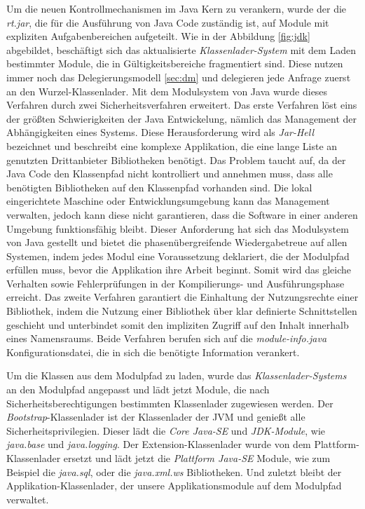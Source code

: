     Um die neuen Kontrollmechanismen im Java Kern zu verankern, wurde der die \textit{rt.jar}, die für die Ausführung von Java Code zuständig ist, auf Module mit expliziten Aufgabenbereichen aufgeteilt. Wie in der Abbildung \ref{fig:jdk} abgebildet, beschäftigt sich das aktualisierte \textit{Klassenlader-System} mit dem Laden bestimmter Module, die in Gültigkeitsbereiche fragmentiert sind. Diese nutzen immer noch das Delegierungsmodell \ref{sec:dm} und delegieren jede Anfrage zuerst an den Wurzel-Klassenlader. Mit dem Modulsystem von Java wurde dieses Verfahren durch zwei Sicherheitsverfahren erweitert. Das erste Verfahren löst eins der größten Schwierigkeiten der Java Entwickelung, nämlich das Management der Abhängigkeiten eines Systems. Diese Herausforderung wird als \textit{Jar-Hell} bezeichnet und beschreibt eine komplexe Applikation, die eine lange Liste an genutzten Drittanbieter Bibliotheken benötigt. Das Problem taucht auf, da der Java Code den Klassenpfad nicht kontrolliert und annehmen muss, dass alle benötigten Bibliotheken auf den Klassenpfad vorhanden sind. Die lokal eingerichtete Maschine oder Entwicklungsumgebung kann das Management verwalten, jedoch kann diese nicht garantieren, dass die Software in einer anderen Umgebung funktionsfähig bleibt.\newline
    Dieser Anforderung hat sich das Modulsystem von Java gestellt und bietet die phasenübergreifende Wiedergabetreue auf allen Systemen, indem jedes Modul eine Voraussetzung deklariert, die der Modulpfad erfüllen muss, bevor die Applikation ihre Arbeit beginnt. Somit wird das gleiche Verhalten sowie Fehlerprüfungen in der Kompilierungs- und Ausführungsphase erreicht.\newline
    Das zweite Verfahren garantiert die Einhaltung der Nutzungsrechte einer Bibliothek, indem die Nutzung einer Bibliothek über klar definierte Schnittstellen geschieht und unterbindet somit den impliziten Zugriff auf den Inhalt innerhalb eines Namensraums. Beide Verfahren berufen sich auf die \textit{module-info.java} Konfigurationsdatei, die in sich die benötigte Information verankert. \bigbreak

    Um die Klassen aus dem Modulpfad zu laden, wurde das \textit{Klassenlader-Systems} an den Modulpfad angepasst und lädt jetzt Module, die nach Sicherheitsberechtigungen bestimmten Klassenlader zugewiesen werden. Der \textit{Bootstrap}-Klassenlader ist der Klassenlader der JVM und genießt alle Sicherheitsprivilegien. Dieser lädt die \textit{Core Java-SE} und \textit{JDK-Module}, wie \textit{java.base} und \textit{java.logging}. Der Extension-Klassenlader wurde von dem Plattform-Klassenlader ersetzt und lädt jetzt die \textit{Plattform Java-SE} Module, wie zum Beispiel die \textit{java.sql}, oder die \textit{java.xml.ws} Bibliotheken. Und zuletzt bleibt der Applikation-Klassenlader, der unsere Applikationsmodule auf dem Modulpfad verwaltet. \cite{classLoadingOracle,modulMitJava9,java9modRevealed}

